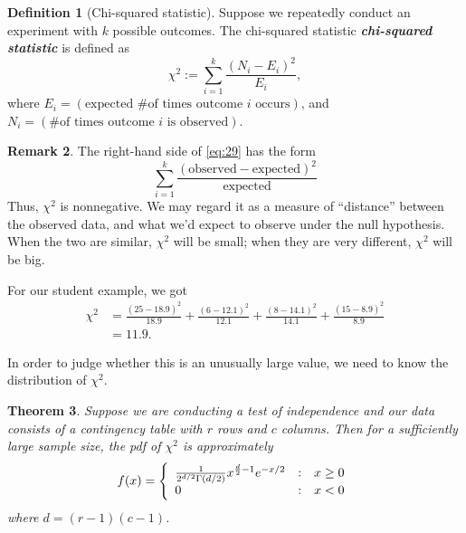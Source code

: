 \documentclass[10pt]{article}
\newtheorem{theorem}{Theorem}
\theoremstyle{definition}
\newtheorem{definition}[theorem]{Definition}
\newtheorem{remark}[theorem]{Remark}
\newcommand{\1}[1]{\textbf{1}_{\left[#1\right]}} %
\DeclareRobustCommand{\demph}[1]{%
  \ifmmode
  {\color{Blue}#1}%
  \else
  {\color{Blue}\bfseries\slshape #1}%
  \fi
}
\begin{document}
\begin{definition}[Chi-squared statistic]
  Suppose we repeatedly conduct an experiment with $k$ possible outcomes. The
  \demph{chi-squared statistic} is defined as
  \begin{equation}\label{eq:29}
    \chi^{2}:= \sum_{i=1}^{k} \frac{\left(N_{i}-E_{i}\right)^{2}}{E_{i}},
  \end{equation}
  where $E_{i} = (\text{expected \# of times outcome $i$ occurs})$, and
  $N_{i}= (\text{\# of times outcome $i$ is observed})$.
\end{definition}

\begin{remark}
  The right-hand side of \cref{eq:29} has the form
  \begin{equation*}
    \sum_{i=1}^{k} \frac{\left( \text{observed}- \text{expected} \right)^{2} }{ \text{expected}} 
  \end{equation*}
  Thus, $\chi^{2}$ is nonnegative. We may regard it as a measure of
  ``distance'' between the observed data, and what we'd expect to observe
  under the null hypothesis. When the two are similar, $\chi^{2}$ will be
  small; when they are very different, $\chi^{2}$ will be big.
\end{remark}

For our student example, we got
\begin{align*}
  \chi^{2} 
  &= \frac{\left( 25-18.9 \right)^{2} }{18.9}+ \frac{(6-12.1)^{2}}{12.1}+ \frac{\left( 8-14.1 \right)^{2} }{14.1}+ \frac{\left( 15-8.9 \right)^{2} }{8.9} \\
  &= 11.9.
\end{align*}

In order to judge whether this is an unusually large value, we need to know
the distribution of $\chi^{2}$.


\begin{theorem}
  Suppose we are conducting a test of independence and our data consists of a
  contingency table with $r$ rows and $c$ columns. Then for a sufficiently
  large sample size, the pdf of $\chi^{2}$ is approximately
  \begin{equation}\label{eq:chi-squared-pdf}
    f(x) 
    = \left\{ 
      \begin{array}{l@{\quad:\quad}l} \frac{1}{2^{d/2}\Gamma(d/2)}x^{\frac{d}{2}-1}e^{-x/2} & x \geq 0\\ 0& x<0\end{array}\right.
  \end{equation}
  where $d=(r-1)(c-1)$.
\end{theorem}
\end{document}
